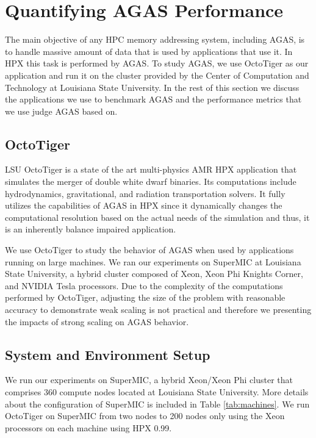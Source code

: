 \section{Quantifying AGAS Performance}
\label{performance}

The main objective of any HPC memory addressing system, including AGAS, is to
handle massive amount of data that is used by applications that use it.
In HPX this task is performed by AGAS. To study AGAS, we use OctoTiger\cite{kadam2017numerical,octotiger_repo} as our application and run it on the cluster
provided by the Center of Computation and Technology at Louisiana State
University. In the rest of this section we discuss the applications
we use to benchmark AGAS and the performance metrics that we use judge AGAS
based on.

\subsection{OctoTiger}
LSU OctoTiger is a state of the art multi-physics AMR HPX application that
simulates the merger of double white dwarf binaries. Its computations include
hydrodynamics, gravitational, and radiation transportation solvers. It fully
utilizes the capabilities of AGAS in HPX since it dynamically changes the
computational resolution based on the actual needs of the simulation and thus, 
it is an inherently balance impaired application.

We use OctoTiger to study the behavior of AGAS when used by applications
running on large machines. We ran our experiments on SuperMIC at Louisiana
State University, a hybrid cluster composed of Xeon, Xeon Phi Knights Corner, 
and NVIDIA Tesla processors. Due to the complexity of the computations
performed by OctoTiger, adjusting the size of the problem with reasonable
accuracy to demonstrate weak scaling is not practical and therefore we
presenting the impacts of strong scaling on AGAS behavior.

\subsection{System and Environment Setup}
We run our experiments on SuperMIC, a hybrid Xeon/Xeon Phi cluster that
comprises 360 compute nodes located at Louisiana State University. More
details about the configuration of SuperMIC is included in Table
\ref{tab:machines}. We run OctoTiger on SuperMIC from
two nodes to 200 nodes only using the Xeon processors on each machine using
HPX 0.99\cite{hartmut_kaiser_2015_33656}.

